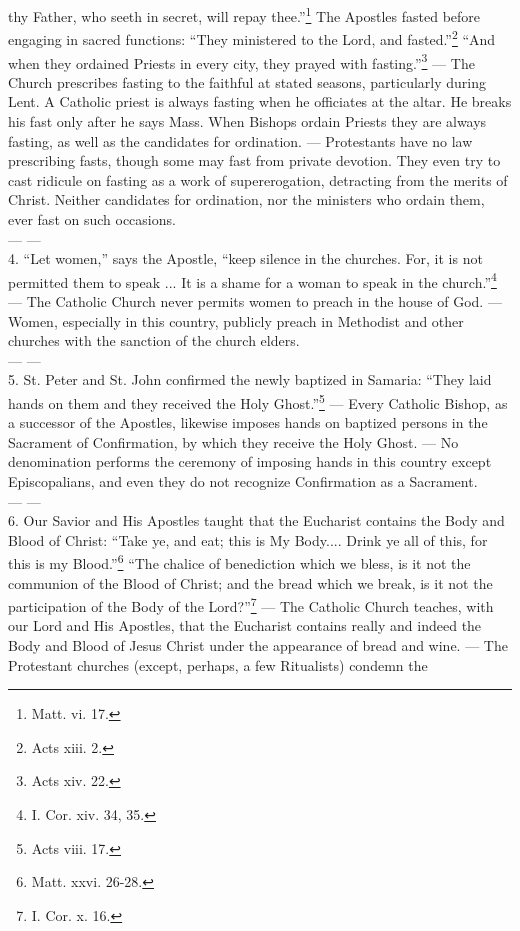 thy Father, who seeth in secret, will repay thee.”\footnote{Matt. vi.
17.} The Apostles fasted before engaging in sacred functions: “They
ministered to the Lord, and fasted.”\footnote{Acts xiii. 2.}
“And when they ordained Priests in every city, they prayed with
fasting.”\footnote{Acts xiv. 22.} — The Church prescribes fasting to the faithful at stated seasons, particularly
during Lent. A Catholic priest is always fasting when he officiates at the altar.
He breaks his fast only after he says Mass. When Bishops ordain Priests they are
always fasting, as well as the candidates for ordination. — Protestants have no law prescribing fasts, though some may fast from private
devotion. They even try to cast ridicule on fasting as a work of supererogation,
detracting from the merits of Christ. Neither candidates for ordination, nor the
ministers who ordain them, ever fast on such occasions. \\
— — \\
4. “Let women,” says the Apostle, “keep silence in the churches. For,
it is not permitted them to speak ... It is a shame for a woman to speak in the
church.”\footnote{I. Cor. xiv. 34, 35.} — The Catholic Church never permits women to preach in the house of God. — Women, especially in this country, publicly preach in Methodist and other
churches with the sanction of the church elders. \\
— — \\
5. St. Peter and St. John confirmed the newly baptized in Samaria: “They
laid hands on them and they received the Holy Ghost.”\footnote{Acts
viii. 17.} — Every Catholic Bishop, as a successor of the Apostles, likewise imposes hands
on baptized persons in the Sacrament of Confirmation, by which they receive the
Holy Ghost. — No denomination performs the ceremony of imposing hands in this country except
Episcopalians, and even they do not recognize Confirmation as a
Sacrament. \\
— — \\
6. Our Savior and His Apostles taught that the Eucharist contains the Body
and Blood of Christ: “Take ye, and eat; this is My Body.... Drink ye all of
this, for this is my Blood.”\footnote{Matt. xxvi. 26-28.}
“The chalice of benediction which we bless, is it not the communion of the
Blood of Christ; and the bread which we break, is it not the participation of the
Body of the Lord?”\footnote{I. Cor. x. 16.} — The Catholic Church teaches, with our Lord and His Apostles, that the
Eucharist contains really and indeed the Body and Blood of Jesus Christ under the
appearance of bread and wine. — The Protestant churches (except, perhaps, a few Ritualists) condemn the
